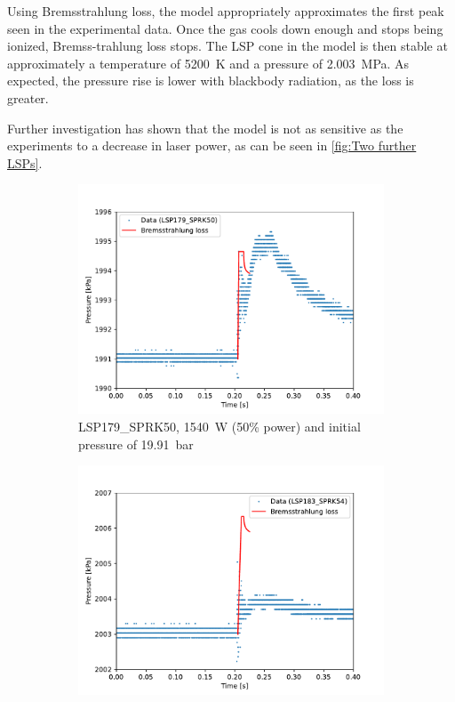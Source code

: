         Using Bremsstrahlung loss, the model appropriately approximates the first peak seen in the experimental data. Once the gas cools down enough and stops being ionized, Bremss-trahlung loss stops. The LSP cone in the model is then stable at approximately a temperature of \qty{5200}{K} and a pressure of \qty{2.003}{MPa}. As expected, the pressure rise is lower with blackbody radiation, as the loss is greater.

        Further investigation has shown that the model is not as sensitive as the experiments to a decrease in laser power, as can be seen in \autoref{fig:Two further LSPs}.

        \begin{figure}[!ht]
            \centering
            \begin{subfigure}[t]{0.45\textwidth}
                \centering
                \includegraphics[width=\textwidth]{assets/2 models/LSP179_SPRK50.pdf}
                \caption{LSP179\_SPRK50, \qty{1540}{W} (50\% power) and initial pressure of \qty{19.91}{bar}}
            \end{subfigure}
            \hfill
            \begin{subfigure}[t]{0.45\textwidth}
                \centering
                \includegraphics[width=\textwidth]{assets/2 models/LSP183_SPRK54.pdf}

\end{subfigure}
\end{figure}
